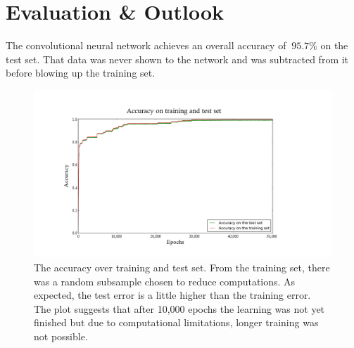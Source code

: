 \documentclass[11pt,a4paper]{article}
\begin{document}
\section{Evaluation \& Outlook}
The convolutional neural network achieves an overall accuracy of $~95.7 \%$ on the test set. That data was never shown to the network and was subtracted from it before blowing up the training set.\\
\begin{figure}[h!]
	\includegraphics[width=\textwidth]{accuracy.png}
	\centering
	\caption[Accuracy]{The accuracy over training and test set. From the training set, there was a random subsample chosen to reduce computations. As expected, the test error is a little higher than the training error.\\
The plot suggests that after 10,000 epochs the learning was not yet finished but due to computational limitations, longer training was not possible.}
	\label{fig:architecture}
\end{figure}
\newpage


\end{document}
